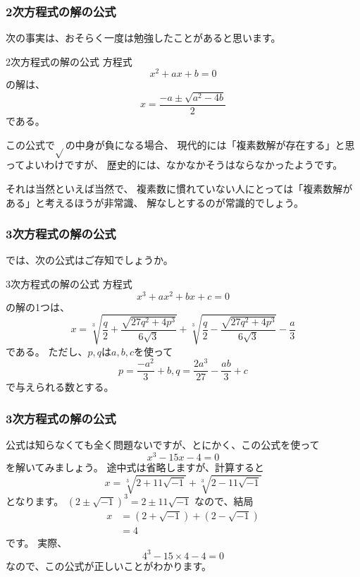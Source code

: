 \documentclass[dvipdfmx]{beamer}
\begin{document}
  \begin{frame}
    \frametitle{2次方程式の解の公式}
  
    次の事実は、おそらく一度は勉強したことがあると思います。
    \begin{block}{2次方程式の解の公式}
      方程式
      \[
        x^2 + ax + b = 0
      \]
      の解は、
      \[
        x = \frac{-a \pm \sqrt{a^2 - 4b}}{2}
      \]
      である。
    \end{block}
    この公式で$\sqrt{}$の中身が負になる場合、
    現代的には「複素数解が存在する」と思ってよいわけですが、
    歴史的には、なかなかそうはならなかったようです。

    それは当然といえば当然で、
    複素数に慣れていない人にとっては「複素数解がある」と考えるほうが非常識、
    解なしとするのが常識的でしょう。
  
  \end{frame}

  \begin{frame}
    \frametitle{3次方程式の解の公式}
  
    では、次の公式はご存知でしょうか。
    \begin{block}{3次方程式の解の公式}
      方程式
      \[
        x^3 + ax^2 + bx + c = 0
      \]
      の解の1つは、
      \[
        x = \sqrt[3]{\frac{q}{2} + \frac{\sqrt{27q^2 + 4p^3}}{6\sqrt{3}}} + \sqrt[3]{\frac{q}{2} - \frac{\sqrt{27q^2 + 4p^3}}{6\sqrt{3}}} - \frac{a}{3} 
      \]
      である。
      ただし、$p, q$は$a, b, c$を使って
      \[
        p = \frac{-a^2}{3} + b, q = \frac{2a^3}{27} - \frac{ab}{3} + c
      \]
      で与えられる数とする。
    \end{block}
  
  \end{frame}

  \begin{frame}
    \frametitle{3次方程式の解の公式}
  
    公式は知らなくても全く問題ないですが、とにかく、この公式を使って
    \[
      x^3 - 15x - 4 = 0
    \]
    を解いてみましょう。
    途中式は省略しますが、計算すると
    \[
      x = \sqrt[3]{2 + 11\sqrt{-1}} + \sqrt[3]{2 - 11\sqrt{-1}}
    \]
    となります。
    $(2 \pm \sqrt{-1})^3 = 2 \pm 11\sqrt{-1}$ なので、結局
    \[
    \begin{split}
      x & = (2 + \sqrt{-1}) + (2 - \sqrt{-1})\\
        & = 4
    \end{split}
    \]
    です。
    実際、
    \[
      4^3 - 15 \times 4 - 4 = 0
    \]
    なので、この公式が正しいことがわかります。
  
  \end{frame}
\end{document}
